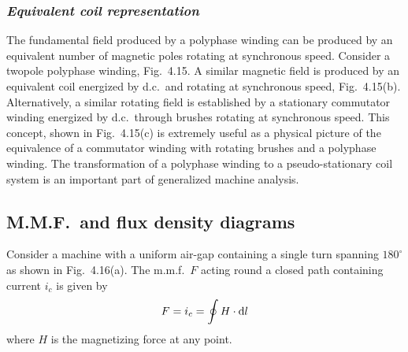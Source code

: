 \documentclass[a4paper,numbers=noenddot,12pt]{scrbook}
\begin{document}
            \subsubsection{\textit{Equivalent coil representation}}
            The fundamental field produced by a polyphase winding can be produced by an equivalent number of magnetic poles rotating at synchronous speed. Consider a two­pole polyphase winding, Fig.\ 4.15. A similar magnetic field is produced by an equivalent coil energized by d.c.\ and rotating at synchronous speed, Fig.\ 4.15(b). Alternatively, a similar rotating field is established by a stationary commutator winding energized by
            d.c.\ through brushes rotating at synchronous speed. This concept, shown in Fig.\ 4.15(c) is extremely useful as a physical picture of the equivalence of a commutator winding with rotating brushes and a polyphase winding. The transformation of a polyphase winding to a pseudo-stationary coil system is an important part of generalized machine analysis. 

            \subsection{M.M.F.\ and flux density diagrams}
            Consider a machine with a uniform air-gap containing a single turn spanning $180^{\circ}$ as shown in Fig.\ 4.16(a). The m.m.f.\ $F$ acting round a closed path containing current $i_c$ is given by
            \begin{equation}
                F = i_c = \oint H \cdot \dif l
                \label{eq:Eq4.4}
            \end{equation}
            where $H$ is the magnetizing force at any point.
\end{document}
